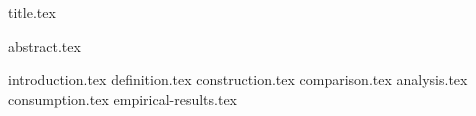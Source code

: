 \documentclass[11pt]{llncs}
\begin{document}
{title.tex}

\ifccs
\maketitle
\fi

\iflncs
\thispagestyle{plain}
\fi

{abstract.tex}

{introduction.tex}
{definition.tex}
{construction.tex}
{comparison.tex}
{analysis.tex}
{consumption.tex}
{empirical-results.tex}

\newpage
\ifccs
  
\else
  
\fi


\end{document}
